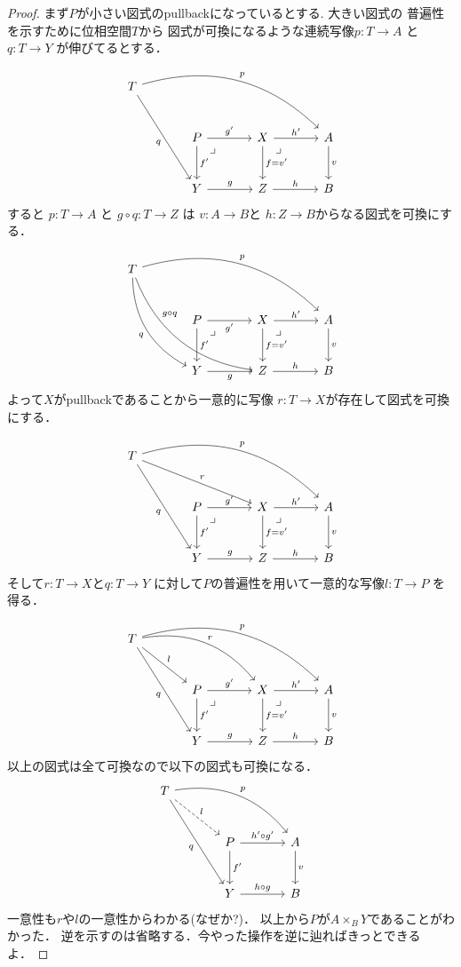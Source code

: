 \documentclass[leqno, a4paper, 12pt, dvipdfmx]{jsarticle}
\begin{document}
\begin{proof}
まず$P$が小さい図式のpullbackになっているとする.
大きい図式の
普遍性を示すために位相空間$T$から
図式が可換になるような連続写像$p\colon T\to A$
と
$q\colon T\to Y$
が伸びてるとする．
\[
\begin{tikzcd}[column sep=large,row sep=large]
T \arrow[drrr, bend left, "p"] \arrow[ddr,"q"'] & & & \\
& P \arrow[r,"g'"] \arrow[d,"f'"]
\arrow[dr,phantom,"\lrcorner",very near start]
& X \arrow[d,"f=v'"]
\arrow[r,"h'"]
\arrow[dr,phantom,"\lrcorner",very near start]
& A \arrow[d,"v"] \\
& Y \arrow[r,"g"] & Z \arrow[r,"h"] & B
\end{tikzcd}
\]
すると
$p\colon T\to A$
と
$g\circ q\colon T\to Z$
は
$v\colon A\to B$と
$h\colon Z\to B$からなる図式を可換にする．
\[
\begin{tikzcd}[column sep=large,row sep=large]
T \arrow[drrr, bend left, "p"] \arrow[ddr, bend right,  "q"'] \arrow[ddrr, bend right, "g\circ q"{pos=0.3}]& & & \\
& P \arrow[r,"g'"'] \arrow[d,"f'"]
\arrow[dr,phantom,"\lrcorner",very near start]
& X \arrow[d,"f=v'"]
\arrow[r,"h'"]
\arrow[dr,phantom,"\lrcorner",very near start]
& A \arrow[d,"v"] \\
& Y \arrow[r,"g"'] & Z \arrow[r,"h"] & B
\end{tikzcd}
\]
よって$X$がpullbackであることから一意的に写像
$r\colon T\to X$が存在して図式を可換にする．
\[
\begin{tikzcd}[column sep=large,row sep=large]
T \arrow[drrr, bend left, "p"] \arrow[drr,"r"]\arrow[ddr,"q"'] & & & \\
& P \arrow[r,"g'"] \arrow[d,"f'"]
\arrow[dr,phantom,"\lrcorner",very near start]
& X \arrow[d,"f=v'"]
\arrow[r,"h'"]
\arrow[dr,phantom,"\lrcorner",very near start]
& A \arrow[d,"v"] \\
& Y \arrow[r,"g"] & Z \arrow[r,"h"] & B
\end{tikzcd}
\]
そして$r\colon T\to X$と$q\colon T\to Y$
に対して$P$の普遍性を用いて一意的な写像$l\colon T\to P$
を得る．
\[
\begin{tikzcd}[column sep=large,row sep=large]
T \arrow[drrr, bend left, "p"] \arrow[drr, bend left, "r"]\arrow[dr,"l"]\arrow[ddr,"q"'] & & & \\
& P \arrow[r,"g'"] \arrow[d,"f'"]
\arrow[dr,phantom,"\lrcorner",very near start]
& X \arrow[d,"f=v'"]
\arrow[r,"h'"]
\arrow[dr,phantom,"\lrcorner",very near start]
& A \arrow[d,"v"] \\
& Y \arrow[r,"g"] & Z \arrow[r,"h"] & B
\end{tikzcd}
\]
以上の図式は全て可換なので以下の図式も可換になる．
\[
\begin{tikzcd}[column sep=large,row sep=large]
T \arrow[dr,dashed,"l"] \arrow[drr, bend left, "p"] \arrow[ddr,"q"'] & & \\
& P \arrow[r,"h'\circ g'"] \arrow[d,"f'"] & A \arrow[d,"v"] \\
& Y \arrow[r,"h\circ g"] & B
\end{tikzcd}
\]
一意性も$r$や$l$の一意性からわかる(なぜか?)．
以上から$P$が$A\times_{B} Y$であることがわかった．
逆を示すのは省略する．今やった操作を逆に辿ればきっとできるよ．
\end{proof}
\end{document}
